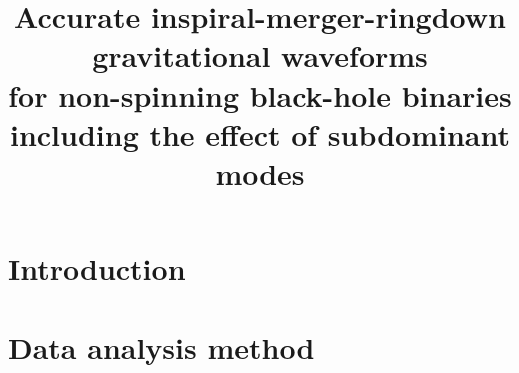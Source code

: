 \documentclass[prd,preprintnumbers,twocolumn,eqsecnum,floatfix,a4paper,nofootinbib,superscriptaddress]{revtex4}
\begin{document}
\newcommand{\be}{\begin{equation}}
\newcommand{\ee}{\end{equation}}
\newcommand{\ber}{\begin{eqnarray}}
\newcommand{\eer}{\end{eqnarray}}
\def\bea{\begin{eqnarray}}
\def\eea{\end{eqnarray}}
\newcommand{\etal}{\emph{et al}}

\title{Accurate inspiral-merger-ringdown gravitational waveforms \\ for non-spinning black-hole binaries including the effect of subdominant modes}

\begin{abstract}
\end{abstract}
\maketitle
\section{Introduction}
\section{Data analysis method}
\end{document}
